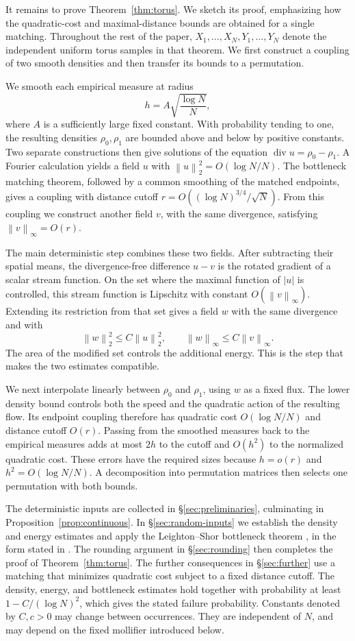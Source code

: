 \documentclass[11pt]{article}
\newcommand{\diver}{\operatorname{div}}
\newcommand{\norm}[1]{\left\lVert #1\right\rVert}
\newcommand{\abs}[1]{\left\lvert #1\right\rvert}
\theoremstyle{remark}
\numberwithin{equation}{section}
\begin{document}
It remains to prove Theorem~\ref{thm:torus}. We sketch its proof,
emphasizing how the quadratic-cost and maximal-distance bounds are
obtained for a single matching. Throughout the rest of the paper,
\(X_1,\ldots,X_N,Y_1,\ldots,Y_N\) denote the independent uniform
torus samples in that theorem. We first construct a coupling of two
smooth densities and then transfer its bounds to a permutation.

We smooth each empirical measure at radius
\[
 h=A\sqrt{\frac{\log N}{N}},
\]
where \(A\) is a sufficiently large fixed constant. With probability
tending to one, the resulting densities \(\rho_0,\rho_1\) are bounded
above and below by positive constants. Two separate constructions then
give solutions of the equation \(\diver u=\rho_0-\rho_1\). A Fourier
calculation yields a field \(u\) with
\(\norm u_2^2=O(\log N/N)\). The bottleneck matching theorem, followed
by a common smoothing of the matched endpoints, gives a coupling with
distance cutoff \(r=O((\log N)^{3/4}/\sqrt N)\). From this coupling
we construct another field \(v\), with the same divergence, satisfying
\(\norm v_\infty=O(r)\).

The main deterministic step combines these two fields. After subtracting
their spatial means, the divergence-free difference \(u-v\) is the
rotated gradient of a scalar stream function. On the set where the
maximal function of \(\abs u\) is controlled, this stream function is
Lipschitz with constant \(O(\norm v_\infty)\). Extending its restriction
from that set gives a field \(w\) with the same divergence and with
\[
 \norm w_2^2\le C\norm u_2^2,
 \qquad \norm w_\infty\le C\norm v_\infty.
\]
The area of the modified set controls the additional energy. This is
the step that makes the two estimates compatible.

We next interpolate linearly between \(\rho_0\) and \(\rho_1\), using
\(w\) as a fixed flux. The lower density bound controls both the speed
and the quadratic action of the resulting flow. Its endpoint coupling
therefore has quadratic cost \(O(\log N/N)\) and distance cutoff
\(O(r)\). Passing from the smoothed measures back to the empirical
measures adds at most \(2h\) to the cutoff and \(O(h^2)\) to the
normalized quadratic cost. These errors have the required sizes because
\(h=o(r)\) and \(h^2=O(\log N/N)\). A decomposition into permutation
matrices then selects one permutation with both bounds.

The deterministic inputs are collected in \S\ref{sec:preliminaries},
culminating in Proposition~\ref{prop:continuous}.
In \S\ref{sec:random-inputs} we establish the density and energy
estimates and apply the Leighton--Shor bottleneck theorem
\cite{LS89}, in the form stated in \cite[Theorem~4.7.1]{Tal21}.
The rounding argument in \S\ref{sec:rounding} then completes the
proof of Theorem~\ref{thm:torus}.
The further consequences in \S\ref{sec:further} use a matching
that minimizes quadratic cost subject to a fixed distance cutoff.
The density, energy, and bottleneck estimates hold together with probability at least
\(1-C/(\log N)^2\), which gives the stated failure probability.
Constants denoted by \(C,c>0\) may change between occurrences.
They are independent of \(N\), and may depend on the fixed mollifier
introduced below.
\end{document}
